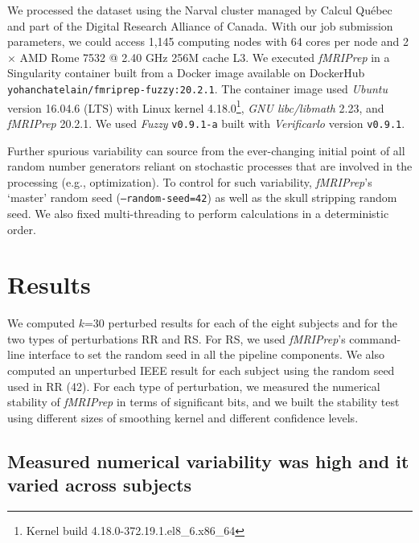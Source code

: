 \documentclass[lettersize,journal]{IEEEtran}
\newcommand{\fmriprep}{\emph{fMRIPrep}\xspace}
\begin{document}
{%
We processed the dataset using the Narval cluster managed by Calcul Qu\'ebec and part of the Digital Research Alliance of Canada.
With our job submission parameters, we could access 1,145 computing nodes with 64 cores per node and 2 $\times$ AMD Rome 7532 @ 2.40 GHz 256M cache L3. We executed \fmriprep in a Singularity container built from a Docker image available on DockerHub \texttt{yohanchatelain/fmriprep-fuzzy:20.2.1}.
The container image used \emph{Ubuntu} version 16.04.6 (LTS) with Linux kernel 4.18.0\footnote{Kernel build 4.18.0-372.19.1.el8\_6.x86\_64}, \emph{GNU libc/libmath} 2.23, and \fmriprep 20.2.1.
We used \emph{Fuzzy} \texttt{v0.9.1-a} built with \emph{Verificarlo} version \texttt{v0.9.1}.

Further spurious variability can source from the ever-changing initial point of all random number generators reliant on stochastic processes that are involved in the processing (e.g., optimization).
To control for such variability, \fmriprep's `master' random seed (\texttt{--random-seed=42}) as well as the skull stripping random seed. We also fixed multi-threading to perform calculations in a deterministic order.


\section{Results}

We computed $k$=30 perturbed results for each of the eight subjects and for the two types of perturbations RR and RS. For RS, we used \fmriprep's command-line interface to set the random seed in all the pipeline components. We also computed an unperturbed IEEE result for each subject using the random seed used in RR (42). For each type of perturbation, we measured the numerical stability of \fmriprep in terms of significant bits, and we built the stability test using different sizes of smoothing kernel and different confidence levels.

\subsection{Measured numerical variability was high and it varied across subjects}

}
\end{document}
